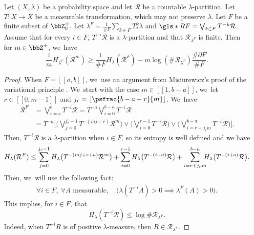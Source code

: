 \begin{lem}
\label{lem:Misiurewicz}
Let $(X, \lambda)$ be a probability space and let $\mathcal{R}$ be a countable $\lambda$-partition. Let $T : X \to X$ be a measurable transformation, which may not preserve $\lambda$. Let $F$ be a finite subset of $\bbZ_0^+$.
Let $\lambda^F = \frac{1}{\# F} \sum_{k \in F} T^k_* \lambda$ and $\gls*{RF} = \bigvee_{k \in F} T^{-k} \mathcal{R}$.
Assume that for every $i \in F$, $T^{-i} \mathcal{R}$ is a $\lambda$-partition and that $\mathcal{R}_{\lambda^F}$ is finite.
Then for $m \in \bbZ^+$, we~have
\[
\frac{1}{m} H_{\lambda^F} (\mathcal{R}^m) \geq \frac{1}{\# F} H_{\lambda}(\mathcal{R}^F) - m \log (\# \mathcal{R}_{\lambda^F}) \frac{\# \partial F}{\# F}.
\]
\end{lem}
\begin{proof}
When $F = [\![ a, b ]\!]$, we~use an argument from Misiurewicz's proof of the variational principle \cite{Misiurewicz1976}. We~start with the case $m \in [\![ 1, b-a ]\!]$, we~let $r \in [\![ 0, m-1 ]\!]$ and $j_r = \lfloor \psfrac{b-a - r}{m} \rfloor$. We~have
\begin{align*}
\mathcal{R}^F &= \bigvee_{i=a}^b T^{-i} \mathcal{R}
= T^{-a} \bigvee_{i=0}^{b-a} T^{-i} \mathcal{R}\\
&=T^{-a} \biggl [ \biggl (\bigvee_{j=0}^{j_r - 1} T^{-(mj + r)} \mathcal{R}^m \biggr)
\vee \biggl (\bigvee_{i=0}^{r-1} T^{-i} \mathcal{R} \biggr)
\vee \biggl (\bigvee_{i=r+j_r m}^{b-a} T^{-i} \mathcal{R} \biggr) \biggr ].
\end{align*}
Then, $T^{-i} \mathcal{R}$ is a $\lambda$-partition when $i \in F$, so its entropy is well defined and we have
\begin{align*}
H_{\lambda}(\mathcal{R}^F)
\leq \sum_{j=0}^{j_r - 1} H_{\lambda} \bigl (T^{-(mj + r+a)} \mathcal{R}^m \bigr)
+ \sum_{i=0}^{r-1} H_{\lambda} \bigl (T^{-(i+a)} \mathcal{R} \bigr)
+ \sum_{i=r+j_r m}^{b-a}\hspace*{-2mm} H_{\lambda} \bigl (T^{-(i+a)} \mathcal{R} \bigr).
\end{align*}
Then, we~will use the following fact:\enlargethispage{-2\baselineskip}
\begin{align}
\forall i \in F,\; \forall A \text{ measurable},\quad \bigl (\lambda(T^{-i} A) > 0 \implies \lambda^F(A) > 0 \bigr).
\tag{$**$}
\label{link-emp-meas}
\end{align}
This implies, for $i \in F$, that
\[
H_{\lambda}(T^{-i} \mathcal{R}) \leq \log \# \mathcal{R}_{\lambda^F}.
\]
Indeed, when $T^{-i} R$ is of positive $\lambda$-measure, then $R \in \mathcal{R}_{\lambda^F}$.

\end{proof}
